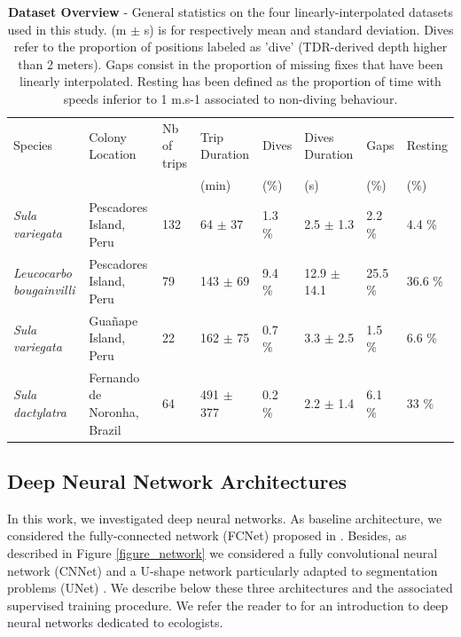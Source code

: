 \documentclass{article}
\begin{document}
\begin{table}[!h]
 \caption{\textbf{Dataset Overview} - General statistics on the four linearly-interpolated datasets used in this study. (m $\pm$ s) is for respectively mean and standard deviation. Dives refer to the proportion of positions labeled as 'dive' (TDR-derived depth higher than 2 meters). Gaps consist in the proportion of missing fixes that have been linearly interpolated. Resting has been defined as the proportion of time with speeds inferior to 1 m.s-1 associated to non-diving behaviour.}
  \centering
  \hspace*{-1.5cm}
  \begin{tabular}{llllllll}
    \toprule
    Species  &  Colony Location & Nb of trips  & Trip Duration & Dives  & Dives Duration & Gaps & Resting \\
      &    &     & (min) & (\%) & (s) & (\%) & (\%) \\
    \midrule
    \textit{Sula variegata}         & Pescadores Island, Peru & 132 & 64 $\pm$ 37  & 1.3 \%  & 2.5 $\pm$ 1.3  & 2.2 \% & 4.4 \%\\
    \textit{Leucocarbo bougainvilli}& Pescadores Island, Peru & 79   & 143 $\pm$ 69  & 9.4 \%  & 12.9 $\pm$ 14.1 & 25.5 \% & 36.6 \%\\
    \textit{Sula variegata}         & Gua\~nape Island, Peru & 22   & 162 $\pm$ 75  & 0.7 \%  & 3.3 $\pm$ 2.5 & 1.5 \% & 6.6 \%\\
    \textit{Sula dactylatra}& Fernando de Noronha, Brazil & 64 & 491 $\pm$ 377  & 0.2 \%  & 2.2 $\pm$ 1.4 & 6.1 \% & 33 \%\\
    \bottomrule
  \end{tabular}
  \label{table_data}
\end{table}

\subsection{Deep Neural Network Architectures}

In this work, we investigated deep neural networks. As baseline architecture, we considered the fully-connected network (FCNet) proposed in \cite{browning_predicting_2018}. Besides, as described in Figure \ref{figure_network} we considered a fully convolutional neural network (CNNet) and a U-shape network particularly adapted to segmentation problems (UNet) \cite{ronneberger_u-net_2015}. We describe below these three architectures and the associated supervised training procedure. We refer the reader to \cite{christin_applications_2019} for an introduction to deep neural networks dedicated to ecologists.
\end{document}
